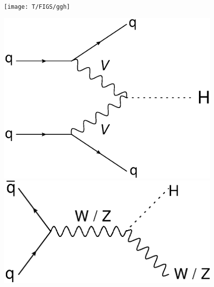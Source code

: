 			\begin{figure}[h]
				\centering
					\begin{minipage}[h]{0.4\linewidth}
						\texttt{[image: T/FIGS/ggh]}
					\end{minipage}
					\quad\quad
					\begin{minipage}[h]{0.4\linewidth}
						\includegraphics[width=1\linewidth]{T/FIGS/vbf}
					\end{minipage}
					\begin{minipage}[h]{0.4\linewidth}
						\includegraphics[width=1\linewidth]{T/FIGS/whzh}
					\end{minipage}
					\quad\quad
					\begin{minipage}[h]{0.4\linewidth}

\end{minipage}
\end{figure}
